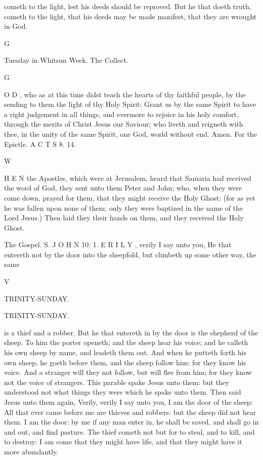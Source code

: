 cometh to the light, lest his deeds should be reproved. But he that doeth truth, cometh to the light, that his deeds may be made manifest, that they are wrought in God.

G

Tuesday in Whitsun Week. The Collect.

G

O D , who as at this time didst teach the hearts of thy faithful people, by the sending to them the light of thy Holy Spirit; Grant us by the same Spirit to have a right judgement in all things, and evermore to rejoice in his holy comfort, through the merits of Christ Jesus our Saviour; who liveth and reigneth with thee, in the unity of the same Spirit, one God, world without end. Amen. For the Epictle. A C T S 8. 14.

W

H E N the Apostles, which were at Jerusalem, heard that Samaria had received the word of God, they sent unto them Peter and John; who, when they were come down, prayed for them, that they might receive the Holy Ghost: (for as yet he was fallen upon none of them; only they were baptized in the name of the Lord Jesus.) Then laid they their hands on them, and they received the Holy Ghost.

The Gospel. S. J O H N 10. 1. E R I L Y , verily I say unto you, He that entereth not by the door into the sheepfold, but climbeth up some other way, the same

V

TRINITY-SUNDAY.

TRINITY-SUNDAY.

is a thief and a robber. But he that entereth in by the door is the shepherd of the sheep. To him the porter openeth; and the sheep hear his voice; and he calleth his own sheep by name, and leadeth them out. And when he putteth forth his own sheep, he goeth before them, and the sheep follow him: for they know his voice. And a stranger will they not follow, but will flee from him; for they know not the voice of strangers. This parable spake Jesus unto them: but they understood not what things they were which he spake unto them. Then said Jesus unto them again, Verily, verily I say unto you, I am the door of the sheep: All that ever came before me are thieves and robbers: but the sheep did not hear them. I am the door: by me if any man enter in, he shall be saved, and shall go in and out, and find pasture. The thief cometh not but for to steal, and to kill, and to destroy: I am come that they might have life, and that they might have it more abundantly.

